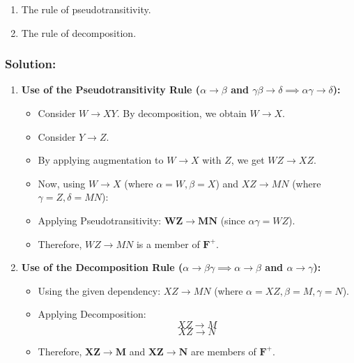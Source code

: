 \documentclass{article}
\begin{document}
    \begin{enumerate}
        \item The rule of pseudotransitivity.
        \item The rule of decomposition.
    \end{enumerate}

\subsubsection*{Solution:}
   \begin{enumerate}
       \item \textbf{Use of the Pseudotransitivity Rule ($\alpha \rightarrow \beta$ and $\gamma\beta \rightarrow \delta \implies \alpha\gamma \rightarrow \delta$):}
       \begin{itemize}
           \item Consider $W \rightarrow XY$. By decomposition, we obtain $W \rightarrow X$.
           \item Consider $Y \rightarrow Z$.
           \item By applying augmentation to $W \rightarrow X$ with $Z$, we get $WZ \rightarrow XZ$.
           \item Now, using $W \rightarrow X$ (where $\alpha=W, \beta=X$) and $XZ \rightarrow MN$ (where $\gamma=Z, \delta=MN$):
           \item Applying Pseudotransitivity: $\mathbf{WZ \rightarrow MN}$ (since $\alpha\gamma = WZ$).
           \item Therefore, $WZ \rightarrow MN$ is a member of $\mathbf{F^+}$.
       \end{itemize}

       \item \textbf{Use of the Decomposition Rule ($\alpha \rightarrow \beta\gamma \implies \alpha \rightarrow \beta$ and $\alpha \rightarrow \gamma$):}
       \begin{itemize}
           \item Using the given dependency: $XZ \rightarrow MN$ (where $\alpha=XZ, \beta=M, \gamma=N$).
           \item Applying Decomposition:
           $$XZ \rightarrow M$$
           $$XZ \rightarrow N$$
           \item Therefore, $\mathbf{XZ \rightarrow M}$ and $\mathbf{XZ \rightarrow N}$ are members of $\mathbf{F^+}$.
       \end{itemize}
   \end{enumerate}
\end{document}
